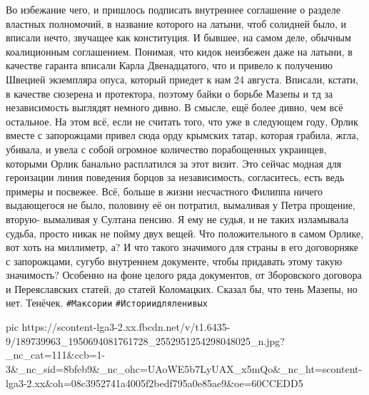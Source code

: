 Во избежание чего, и пришлось подписать внутреннее соглашение о разделе властных полномочий, в название которого на латыни, чтоб солидней было, и вписали нечто, звучащее как конституция.
И бывшее, на самом деле, обычным коалиционным соглашением.
Понимая, что кидок неизбежен даже на латыни,  в качестве гаранта вписали Карла Двенадцатого, что и привело к получению Швецией экземпляра опуса, который приедет к нам 24 августа.
Вписали, кстати, в качестве сюзерена и протектора, поэтому байки о борьбе Мазепы и тд за независимость выглядят немного дивно.
В смысле, ещё более дивно, чем всё остальное.
На этом всё, если не считать того, что уже в следующем году, Орлик вместе с запорожцами привел сюда орду крымских татар, которая грабила, жгла, убивала, и увела с собой огромное количество порабощенных украинцев, которыми Орлик банально расплатился за этот визит.
Это сейчас модная для героизации линия поведения борцов за независимость, согласитесь, есть ведь примеры и посвежее.
Всё, больше в жизни несчастного Филиппа ничего выдающегося не было, половину её он потратил, вымаливая у Петра прощение, вторую- вымаливая у Султана пенсию.
Я ему не судья, и не таких изламывала судьба, просто никак не пойму двух вещей.
Что положительного в самом Орлике, вот хоть на миллиметр, а?
И что такого значимого для страны в его договорняке с запорожцами, сугубо внутреннем документе, чтобы придавать этому такую значимость?
Особенно на фоне целого ряда документов, от Зборовского договора и Переяславских статей, до статей Коломацких.
Сказал бы, что тень Мазепы, но нет.
Тенёчек.
\verb|#Максории|
\verb|#Историидляленивых|
\restorecr

\ifcmt
  pic https://scontent-lga3-2.xx.fbcdn.net/v/t1.6435-9/189739963_1950694081761728_2552951254298048025_n.jpg?_nc_cat=111&ccb=1-3&_nc_sid=8bfeb9&_nc_ohc=UAoWE5b7LyUAX_x5mQo&_nc_ht=scontent-lga3-2.xx&oh=08c3952741a4005f2bedf795a0e85ae9&oe=60CCEDD5
\fi

